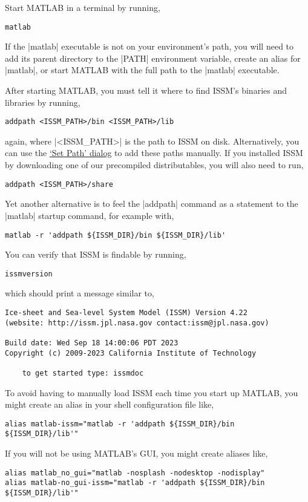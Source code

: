Start MATLAB in a terminal by running,
\begin{lstlisting}
matlab
\end{lstlisting}
If the \lstinlinebg|matlab| executable is not on your environment's path, you will need to add its parent directory to the \lstinlinebg|PATH| environment variable, create an alias for \lstinlinebg|matlab|, or start MATLAB with the full path to the \lstinlinebg|matlab| executable.

After starting MATLAB, you must tell it where to find ISSM's binaries and libraries by running,
\begin{lstlisting}
addpath <ISSM_PATH>/bin <ISSM_PATH>/lib
\end{lstlisting}
again, where \lstinlinebg|<ISSM_PATH>| is the path to ISSM on disk. Alternatively, you can use the \href{https://www.mathworks.com/help/matlab/matlab_env/what-is-the-matlab-search-path.html}{`Set Path' dialog} to add these paths manually. If you installed ISSM by downloading one of our precompiled distributables, you will also need to run,
\begin{lstlisting}
addpath <ISSM_PATH>/share
\end{lstlisting}
Yet another alternative is to feel the \lstinlinebg|addpath| command as a statement to the \lstinlinebg|matlab| startup command, for example with,
\begin{lstlisting}
matlab -r 'addpath ${ISSM_DIR}/bin ${ISSM_DIR}/lib'
\end{lstlisting}

You can verify that ISSM is findable by running,
\begin{lstlisting}
issmversion
\end{lstlisting}
which should print a message similar to,
\begin{lstlisting}
Ice-sheet and Sea-level System Model (ISSM) Version 4.22
(website: http://issm.jpl.nasa.gov contact:issm@jpl.nasa.gov)

Build date: Wed Sep 18 14:00:06 PDT 2023
Copyright (c) 2009-2023 California Institute of Technology

    to get started type: issmdoc
\end{lstlisting}

To avoid having to manually load ISSM each time you start up MATLAB, you might create an alias in your shell configuration file like,
\begin{lstlisting}
alias matlab-issm="matlab -r 'addpath ${ISSM_DIR}/bin ${ISSM_DIR}/lib'"
\end{lstlisting}
If you will not be using MATLAB's GUI, you might create aliases like,
\begin{lstlisting}
alias matlab_no_gui="matlab -nosplash -nodesktop -nodisplay"
alias matlab-no_gui-issm="matlab -r 'addpath ${ISSM_DIR}/bin ${ISSM_DIR}/lib'"
\end{lstlisting}

